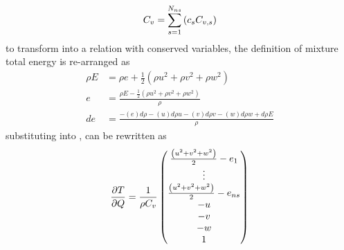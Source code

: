 \begin{equation}
  C_v = \sum\limits_{s=1}^{N_{ns}} \left( c_s C_{v,s} \right)
  \label{cv-mix}
\end{equation}
to transform  into a relation with conserved variables, the
definition of mixture total energy is re-arranged as
\begin{align}
  \rho E &= \rho e + \frac{1}{2}\left( \rho u^2 + \rho v^2 + \rho w^2 \right) \\
  e &= \frac{\rho E - \frac{1}{2} 
       \left( \rho u^2 + \rho v^2 + \rho w^2 \right)}{\rho} \\
  de &= \frac{
        - \left( e \right) d\rho 
        - \left( u \right) d\rho u
        - \left( v \right) d\rho v
        - \left( w \right) d\rho w
        + d \rho E
         }{\rho}
  \label{rhoe-def}
\end{align}
substituting  into ,  can be rewritten as
\begin{equation}
  \frac{\partial T}{\partial Q} =
  \frac{1}{\rho C_v}
  \begin{pmatrix}
    \frac{\left( u^2 + v^2 + w^2 \right)}{2} - e_1 \\
    \vdots \\
    \frac{\left( u^2 + v^2 + w^2 \right)}{2} - e_{ns} \\
    -u \\
    -v \\
    -w \\
    1
  \end{pmatrix}
  \label{tjac-complete}
\end{equation}

